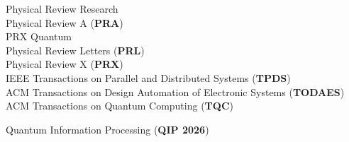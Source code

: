 \begin{cvpubs}
\end{cvpubs}

\begin{cvparagraph}
Physical Review Research \\
Physical Review A (\textbf{PRA}) \\
PRX Quantum \\
Physical Review Letters (\textbf{PRL}) \\
Physical Review X (\textbf{PRX}) \\
IEEE Transactions on Parallel and Distributed Systems (\textbf{TPDS}) \\
ACM Transactions on Design Automation of Electronic Systems (\textbf{TODAES}) \\
ACM Transactions on Quantum Computing (\textbf{TQC})
\end{cvparagraph}

\begin{cvparagraph}
Quantum Information Processing (\textbf{QIP 2026})
\end{cvparagraph}
